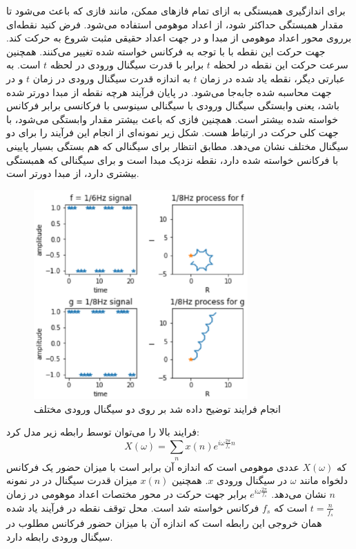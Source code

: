برای اندازگیری همبستگی به ازای تمام فازهای ممکن، مانند فازی که باعث می‌شود تا
مقدار همبستگی حداکثر شود، از اعداد موهومی استفاده می‌شود. فرض کنید نقطه‌ای برروی
محور اعداد موهومی از مبدا و در جهت اعداد حقیقی مثبت شروع به حرکت کند. جهت حرکت
این نقطه با با توجه به فرکانس خواسته شده تغییر می‌کنند. همچنین سرعت حرکت این
نقطه در لحظه $t$ برابر با قدرت سیگنال ورودی در  لحظه $t$ است. به عبارتی دیگر،
نقطه یاد شده در زمان $t$ به اندازه قدرت سیگنال ورودی در زمان $t$ و در جهت محاسبه
شده جابه‌جا می‌شود. در پایان فرآیند هرچه نقطه از مبدا دورتر شده باشد، یعنی
وابستگی سیگنال ورودی با سیگنالی سینوسی با فرکانسی برابر فرکانس خواسته شده بیشتر
است. همچنین فازی که باعث بیشتر مقدار وابستگی می‌شود، با جهت کلی حرکت در ارتباط
هست. شکل زیر نمونه‌ای از انجام این فرآیند را برای دو سیگنال مختلف نشان می‌دهد.
مطابق انتظار برای سیگنالی که هم بستگی بسیار پایینی با فرکانس خواسته شده دارد،
نقطه نزدیک مبدا است و برای سیگنالی که همبستگی بیشتری دارد، از مبدا دورتر است.
\begin{figure}[ht]
    \centering
    \includegraphics[height=8cm]{./statics/spectral_domain_process.png}
    \caption{انجام فرایند توضیح داده شد بر روی دو سیگنال ورودی مختلف}
\end{figure}

فرایند بالا را می‌توان توسط رابطه زیر مدل کرد:
\begin{equation}
    X(\omega) = \sum_{n} x(n)e^{i \omega \frac{2\pi}{f_s} n}
\end{equation}
که $X(\omega)$ عددی موهومی است که اندازه آن برابر است با میزان حضور یک فرکانس
دلخواه مانند $\omega$ در سیگنال ورودی $x$. همچنین $x(n)$ میزان قدرت سیگنال در در
نمونه $n$ نشان می‌دهد. $e^{i \omega \frac{2\pi}{f_s}}$ برابر جهت حرکت در محور‌
مختصات اعداد موهومی در زمان $t = \frac{n}{f_s}$ است که $f_s$ فرکانس خواسته شد
است. محل توقف نقطه در فرآیند یاد شده همان خروجی این رابطه است که اندازه آن با
میزان حضور فرکانس مطلوب در سیگنال ورودی رابطه دارد.

